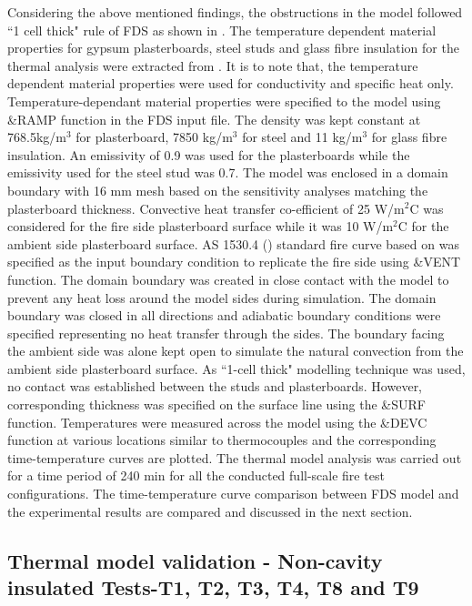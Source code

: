 Considering the above mentioned findings, the obstructions in the model followed ``1 cell thick" rule of FDS as shown in . The temperature dependent material properties for gypsum plasterboards, steel studs and glass fibre insulation for the thermal analysis were extracted from \citet{Rusthi2017}. It is to note that, the temperature dependent material properties were used for conductivity and specific heat only. Temperature-dependant material properties were specified to the model using \&RAMP function in the FDS input file. The density was kept constant at 768.5kg/m\(^3\) for plasterboard, 7850 kg/m\(^3\) for steel and 11 kg/m\(^3\) for glass fibre insulation. An emissivity of 0.9 was used for the plasterboards while the emissivity used for the steel stud was 0.7. The model was enclosed in a domain boundary with 16 mm mesh based on the sensitivity analyses matching the plasterboard thickness. Convective heat transfer co-efficient of 25 W/m$^2$\degree C was considered for the fire side plasterboard surface while it was 10 W/m$^2$\degree C for the ambient side plasterboard surface. AS 1530.4 (\citet{StandardsAustral2014}) standard fire curve based on \citet{iso834} was specified as the input boundary condition to replicate the fire side using \&VENT function. The domain boundary was created in close contact with the model to prevent any heat loss around the model sides during simulation. The domain boundary was closed in all directions and adiabatic boundary conditions were specified representing no heat transfer through the sides. The boundary facing the ambient side was alone kept open to simulate the natural convection from the ambient side plasterboard surface. As ``1-cell thick" modelling technique was used, no contact was established between the studs and plasterboards. However, corresponding thickness was specified on the surface line using the \&SURF function. Temperatures were measured across the model using the \&DEVC function at various locations similar to thermocouples and the corresponding time-temperature curves are plotted. The thermal model analysis was carried out for a time period of 240 min for all the conducted full-scale fire test configurations. The time-temperature curve comparison between FDS model and the experimental results are compared and discussed in the next section.  

\subsection{Thermal model validation - Non-cavity insulated Tests-T1, T2, T3, T4, T8 and T9}

